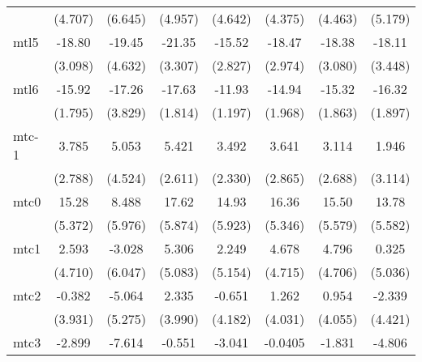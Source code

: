\documentclass{article}
\begin{document}
{\begin{longtable}{l*{7}{c}}
                &  (4.707)         &  (6.645)         &  (4.957)         &  (4.642)         &  (4.375)         &  (4.463)         &  (5.179)         \\
mtl5            &   -18.80\sym{***}&   -19.45\sym{***}&   -21.35\sym{***}&   -15.52\sym{***}&   -18.47\sym{***}&   -18.38\sym{***}&   -18.11\sym{***}\\
                &  (3.098)         &  (4.632)         &  (3.307)         &  (2.827)         &  (2.974)         &  (3.080)         &  (3.448)         \\
mtl6            &   -15.92\sym{***}&   -17.26\sym{***}&   -17.63\sym{***}&   -11.93\sym{***}&   -14.94\sym{***}&   -15.32\sym{***}&   -16.32\sym{***}\\
                &  (1.795)         &  (3.829)         &  (1.814)         &  (1.197)         &  (1.968)         &  (1.863)         &  (1.897)         \\
mtc-1           &    3.785         &    5.053         &    5.421\sym{*}  &    3.492         &    3.641         &    3.114         &    1.946         \\
                &  (2.788)         &  (4.524)         &  (2.611)         &  (2.330)         &  (2.865)         &  (2.688)         &  (3.114)         \\
mtc0            &    15.28\sym{**} &    8.488         &    17.62\sym{**} &    14.93\sym{*}  &    16.36\sym{**} &    15.50\sym{**} &    13.78\sym{*}  \\
                &  (5.372)         &  (5.976)         &  (5.874)         &  (5.923)         &  (5.346)         &  (5.579)         &  (5.582)         \\
mtc1            &    2.593         &   -3.028         &    5.306         &    2.249         &    4.678         &    4.796         &    0.325         \\
                &  (4.710)         &  (6.047)         &  (5.083)         &  (5.154)         &  (4.715)         &  (4.706)         &  (5.036)         \\
mtc2            &   -0.382         &   -5.064         &    2.335         &   -0.651         &    1.262         &    0.954         &   -2.339         \\
                &  (3.931)         &  (5.275)         &  (3.990)         &  (4.182)         &  (4.031)         &  (4.055)         &  (4.421)         \\
mtc3            &   -2.899         &   -7.614         &   -0.551         &   -3.041         &  -0.0405         &   -1.831         &   -4.806         \\

\end{longtable}}
\end{document}
